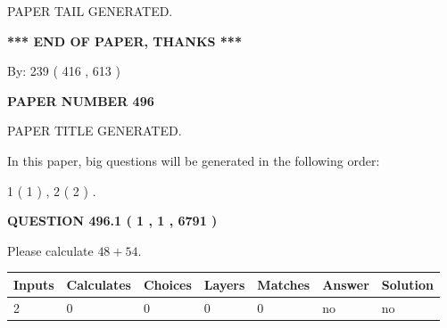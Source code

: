 \documentclass[12pt]{article}
\begin{document}
   
   
\vspace{2.0in} PAPER TAIL GENERATED.
   
   
   
   
\vspace{1.0in} 
{\textbf{\large{ *** END OF PAPER, THANKS *** }}} 
   
   
\hspace{1.0in} By: 
 239 ( 416 ,  613 )
   
   
   
   
\newpage 
\setcounter{page}{ 
   496001 } 
   
   
   
   
 {\textbf{ \Large{ PAPER NUMBER  496  }}}
   
   
\vspace{0.2in}
   
   
   
   
   
   
   
   
 \vspace{0.2in}
 
 
 
 
   
   
 PAPER TITLE GENERATED.
   
   
   
\vspace{0.2in}
   
In this paper, big questions will be generated in the following order: 
   
   
   1 ( 1 )
 ,
   2 ( 2 )
 .
  
\vspace{0.2in}
  
{\textbf{\Large{QUESTION
496.1 
 ( 1 , 1 , 6791 )
}}}
  
  
 
Please calculate $ %
48 +  %
54 $.
 
 
   
   
   
   
\noindent\begin{tabular}{|l|l|l|l|l|l|l|}
 \hline
Inputs & Calculates & Choices & Layers & Matches & Answer & Solution \\ \hline
 2  & 
 0  & 
 0
  & 
 0  & 
 0  & 
  no & 
  no 
  \\ \hline
 \end{tabular}
   
\end{document}

